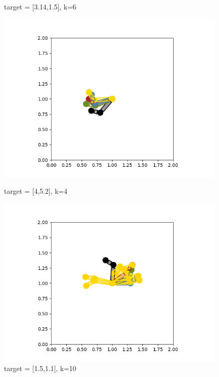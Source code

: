\documentclass{article}
\begin{document}
\begin{figure}[htbp]
\begin{minipage}{0.45\textwidth}
    \caption{target = [3.14,1.5], k=6}
  \end{minipage}
  \begin{minipage}{0.45\textwidth}
    \includegraphics[width=\linewidth]{p1.2.3.png}
    \caption{target = [4,5.2], k=4}
  \end{minipage}\hfill
  \begin{minipage}{0.45\textwidth}
    \includegraphics[width=\linewidth]{p1.2.4.png}
    \caption{target = [1.5,1.1], k=10}
  \end{minipage}
   \begin{minipage}{0.45\textwidth}

\end{minipage}
\end{figure}
\end{document}
